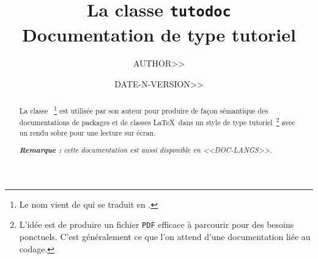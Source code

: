 \documentclass{../main/main}
\begin{document}
\title{La classe \texttt{tutodoc} \\ Documentation de type tutoriel}
\author{AUTHOR>>}
\date{DATE-N-VERSION>>}

\maketitle

\begin{abstract}
    La classe \thisproj{}\,%
    \footnote{
        Le nom vient de  qui se traduit en .
    }
    est utilisée par son auteur pour produire de façon sémantique des documentations de packages et de classes \LaTeX\ dans un style de type tutoriel\,%
    \footnote{
        L'idée est de produire un fichier \texttt{PDF} efficace à parcourir pour des besoins ponctuels. C'est généralement ce que l'on attend d'une documentation liée au codage.
    }
    avec un rendu sobre pour une lecture sur écran.

    \smallskip

    \noindent
    \emph{\textbf{Remarque :} cette documentation est aussi disponible en <<DOC-LANGS>>.}
\end{abstract}
\end{document}
